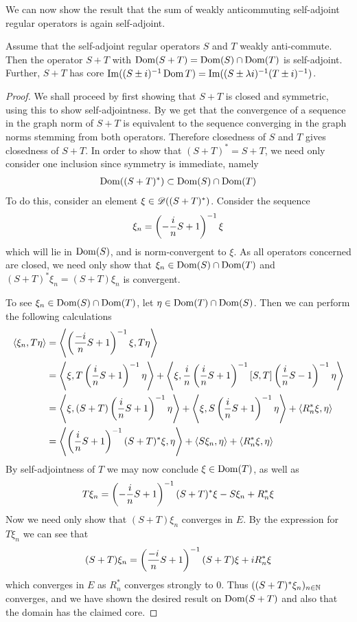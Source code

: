We can now show the result that the sum of weakly anticommuting self-adjoint regular operators is again self-adjoint. 
\begin{theorem}\label{sumselfadjoint}
	Assume that the self-adjoint regular operators $S$ and $T$ weakly anti-commute. Then the operator $S+T$ with $\operatorname{Dom}(S+T)=\operatorname{Dom}(S)\cap \operatorname{Dom}(T)$ is self-adjoint. Further, $S+T$ has core $\operatorname{Im} ((S\pm i)^{-1}\operatorname{Dom} T)=\operatorname{Im}((S\pm \lambda i)^{-1}(T\pm i)^{-1})$. 
\end{theorem}
\begin{proof}
	We shall proceed by first showing that $S+T$ is closed and symmetric, using this to show self-adjointness. 
	By  we get that the convergence of a sequence in the graph norm of $S+T$ is equivalent to the sequence converging in the graph norms stemming from both operators. Therefore closedness of $S$ and $T$ gives closedness of $S+T$. In order to show that $(S+T)^*=S+T$, we need only consider one inclusion since symmetry is immediate, namely
	\begin{align*}
		\operatorname{Dom}((S+T)^*)\subset \operatorname{Dom}(S)\cap \operatorname{Dom}(T)
	\end{align*}
	To do this, consider an element $\xi \in \mathscr{D}((S+T)^*)$. Consider the sequence
	\begin{align*}
		\xi_n=\left ( -\frac{i}{n}S+1 \right )^{-1}\xi
	\end{align*}
	which will lie in $\operatorname{Dom}(S)$, and is norm-convergent to $\xi$. As all operators concerned are closed, we need only show that $\xi_n \in \operatorname{Dom}(S)\cap \operatorname{Dom}(T)$ and $(S+T)^*\xi_n=(S+T)\xi_n$ is convergent.
	
	To see $\xi_n\in \operatorname{Dom}(S)\cap \operatorname{Dom}(T)$, let $\eta\in \operatorname{Dom}(T)\cap \operatorname{Dom}(S)$. Then we can perform the following calculations
	\begin{align*}
		\left \langle \xi_n,T\eta \right \rangle&=\left \langle \left ( \frac{-i}{n}S+1 \right )^{-1}\xi,T\eta \right \rangle \\
		&=\left \langle \xi,T\left ( \frac{i}{n}S+1 \right )^{-1}\eta \right \rangle +\left \langle \xi,\frac{i}{n}\left ( \frac{i}{n}S+1 \right )^{-1}[S,T]\left ( \frac{i}{n}S-1 \right )^{-1}\eta \right \rangle \\ 
		&=\left \langle \xi,(S+T)\left ( \frac{i}{n}S+1 \right )^{-1}\eta \right \rangle+\left \langle \xi,S\left ( \frac{i}{n}S+1 \right )^{-1}\eta \right \rangle+\left \langle R_n^*\xi,\eta \right \rangle \\
		&=\left \langle \left ( \frac{i}{n}S+1 \right )^{-1}(S+T)^*\xi,\eta \right \rangle+\left \langle S\xi_n,\eta \right \rangle+\left \langle R_n^*\xi,\eta \right \rangle
	\end{align*}
	By self-adjointness of $T$ we may now conclude $\xi\in \operatorname{Dom}(T)$, as well as 
	\begin{align*}
		T\xi_n=\left ( -\frac{i}{n}S+1 \right )^{-1}(S+T)^*\xi-S\xi_n+R_n^*\xi
	\end{align*}
	Now we need only show that $(S+T)\xi_n$ converges in $E$. By the expression for $T\xi_n$ we can see that
	\begin{align*}
		(S+T)\xi_n=\left ( \frac{-i}{n}S+1 \right )^{-1}(S+T)\xi+iR_n^*\xi
	\end{align*}
	which converges in $E$ as $R_n^*$ converges strongly to 0. Thus $((S+T)^*\xi_n)_{n\in \mathbb{N}}$ converges, and we have shown the desired result on $\operatorname{Dom}(S+T)$ and also that the domain has the claimed core. 
\end{proof}
